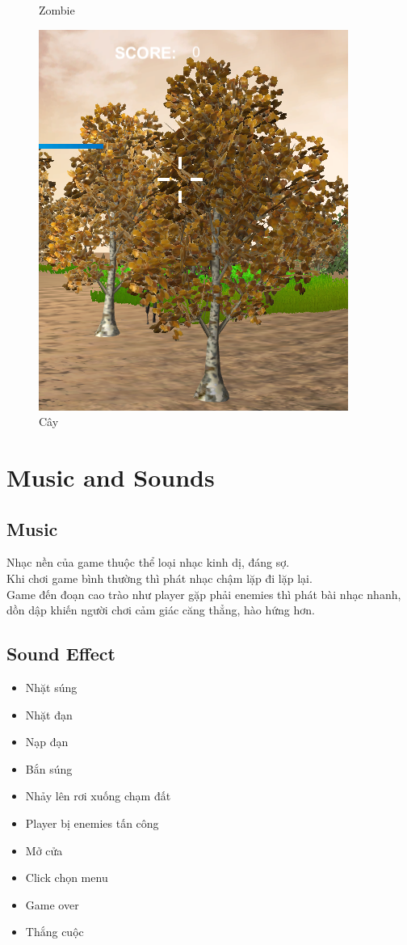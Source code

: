 \documentclass[14pt,a4paper]{extreport}
\begin{document}
\begin{figure}
\begin{center}
	\caption{Zombie}
	\includegraphics[scale=.5]{tree.PNG}
	\caption{Cây}
	\end{center}
\end{figure}


\chapter{Music and Sounds}
\section{Music}
Nhạc nền của game thuộc thể loại nhạc kinh dị, đáng sợ. \\
Khi chơi game bình thường thì phát nhạc chậm lặp đi lặp lại. \\
Game đến đoạn cao trào như player gặp phải enemies thì phát bài nhạc nhanh, dồn dập khiến người chơi cảm giác căng thẳng, hào hứng hơn.

\section{Sound Effect}
\begin{itemize}
	\item Nhặt súng
	\item Nhặt đạn
	\item Nạp đạn
	\item Bắn súng
	\item Nhảy lên rơi xuống chạm đất
	\item Player bị enemies tấn công
	\item Mở cửa
	\item Click chọn menu
	\item Game over
	\item Thắng cuộc
\end{itemize}
\end{document}
